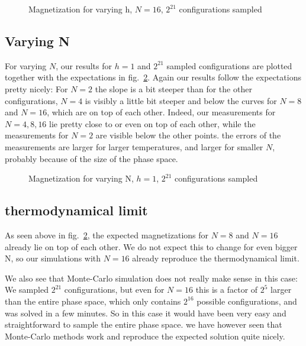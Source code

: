 \documentclass{scrartcl}
\begin{document}
	\begin{figure}[htbp]
		
		\caption{Magnetization for varying h, $N=16$, $2^{21}$ configurations sampled}
		\label{fig:magvarh}
	\end{figure}
	
\subsection{Varying N}

For varying $N$, our results for $h=1$ and $2^{21}$ sampled configurations are plotted together with the expectations in fig.~\ref{fig:magvarN}. Again our results follow the expectations pretty nicely: For $N=2$ the slope is a bit steeper than for the other configurations, $N=4$ is visibly a little bit steeper and below the curves for $N=8$ and $N=16$, which are on top of each other. Indeed, our measurements for $N=4,8,16$ lie pretty close to or even on top of each other, while the measurements for $N=2$ are visible below the other points. the errors of the measurements are larger for larger temperatures, and larger for smaller $N$, probably because of the size of the phase space.

	\begin{figure}[htbp]
		
		\caption{Magnetization for varying N, $h=1$, $2^{21}$ configurations sampled}
		\label{fig:magvarN}
	\end{figure}
	
\subsection{thermodynamical limit}

As seen above in fig.~\ref{fig:magvarN}, the expected magnetizations for $N=8$ and $N=16$ already lie on top of each other. We do not expect this to change for even bigger N, so our simulations with $N=16$ already reproduce the thermodynamical limit. 

We also see that Monte-Carlo simulation does not really make sense in this case: We sampled $2^{21}$ configurations, but even for $N=16$ this is a factor of $2^5$ larger than the entire phase space, which only contains $2^{16}$ possible configurations, and was solved in a few minutes. So in this case it would have been very easy and straightforward to sample the entire phase space. we have however seen that Monte-Carlo methods work and reproduce the expected solution quite nicely.
	
%	
	
\newpage	
\listoffigures
\printbibliography
\end{document}
